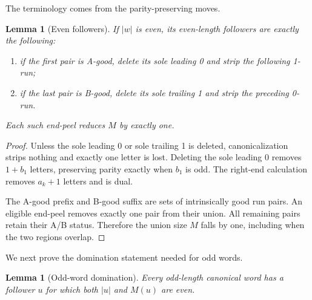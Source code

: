 \documentclass[11pt]{amsart}
\newtheorem{lemma}[theorem]{Lemma}
\theoremstyle{definition}
\begin{document}
The terminology comes from the parity-preserving moves.

\begin{lemma}[Even followers]\label{lem:even-followers}
If $|w|$ is even, its even-length followers are exactly the following:
\begin{enumerate}
\item if the first pair is A-good, delete its sole leading 0 and strip the
following 1-run;
\item if the last pair is B-good, delete its sole trailing 1 and strip the
preceding 0-run.
\end{enumerate}
Each such end-peel reduces $M$ by exactly one.
\end{lemma}

\begin{proof}
Unless the sole leading 0 or sole trailing 1 is deleted, canonicalization
strips nothing and exactly one letter is lost.  Deleting the sole leading 0
removes $1+b_1$ letters, preserving parity exactly when $b_1$ is odd.  The
right-end calculation removes $a_k+1$ letters and is dual.

The A-good prefix and B-good suffix are sets of intrinsically good run pairs.
An eligible end-peel removes exactly one pair from their union.  All remaining
pairs retain their A/B status.  Therefore the union size $M$ falls by one,
including when the two regions overlap.
\end{proof}

We next prove the domination statement needed for odd words.

\begin{lemma}[Odd-word domination]\label{lem:odd}
Every odd-length canonical word has a follower $u$ for which both $|u|$ and
$M(u)$ are even.
\end{lemma}
\end{document}
